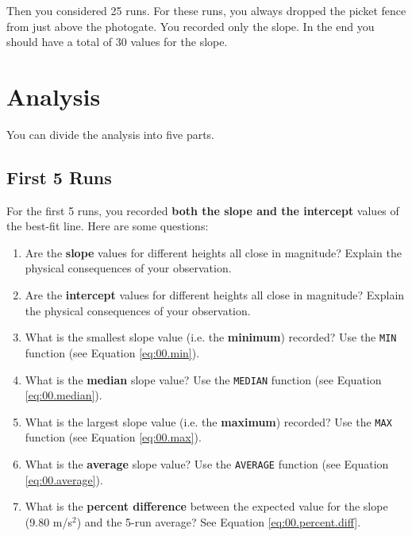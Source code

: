 Then you considered 25 runs. For these runs, you always dropped the picket fence from just above the photogate. You recorded only the slope. In the end you should have a total of 30 values for the slope.
\section{Analysis}
You can divide the analysis into five parts.
\subsection{First 5 Runs} \label{sec:01.first.5}
For the first 5 runs, you recorded \textbf{both the slope and the intercept} values of the best-fit line. Here are some questions:
\begin{enumerate}
    \item Are the \textbf{slope} values for different heights all close in magnitude? Explain the physical consequences of your observation.
    \item Are the \textbf{intercept} values for different heights all close in magnitude? Explain the physical consequences of your observation.
    \item What is the smallest slope value (i.e. the \textbf{minimum}) recorded? Use the \texttt{MIN} function (see Equation \ref{eq:00.min}).
    \item What is the \textbf{median} slope value? Use the \texttt{MEDIAN} function (see Equation \ref{eq:00.median}).
    \item What is the largest slope value (i.e. the \textbf{maximum}) recorded? Use the \texttt{MAX} function (see Equation \ref{eq:00.max}).
    \item What is the \textbf{average} slope value? Use the \texttt{AVERAGE} function (see Equation \ref{eq:00.average}).
    \item What is the \textbf{percent difference} between the expected value for the slope (9.80 m/s$^{2}$) and the 5-run average? See Equation \ref{eq:00.percent.diff}.
\end{enumerate}
